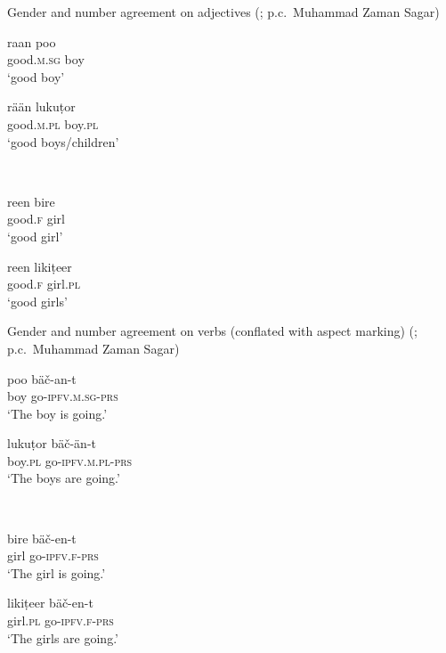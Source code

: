 \documentclass[output=collectionpaper]{langsci/langscibook}
\begin{document}
\begin{xlist}
\ex
Gender and number agreement on adjectives (\citealt[19]{Baart1999}; p.c.\ Muhammad Zaman Sagar)\\
\medskip
\begin{minipage}{0.25\textwidth}
\gll raan poo\\
good.\textsc{m.sg} boy\\
\glt`good boy'
\end{minipage}
%
\begin{minipage}{0.5\textwidth}
\gll rään lukuṭor\\
good.\textsc{m.pl} boy.\textsc{pl}\\
\glt `good boys/children'
\end{minipage}
\\
\vspace{3mm}
\begin{minipage}{0.25\textwidth}
\gll reen bire\\
good.\textsc{f} girl\\
\glt `good girl'
\end{minipage}
%
\begin{minipage}{0.25\textwidth}
\gll reen likiṭeer\\
 good.\textsc{f} girl.\textsc{pl}\\
\glt `good girls'
\end{minipage}
\medskip
\ex
Gender and number agreement on verbs (conflated with aspect marking) (\citealt[19]{Baart1999}; p.c.\ Muhammad Zaman Sagar)\\
\medskip
\begin{minipage}{0.4\textwidth}
\gll poo bäč{}-an{}-t\\
boy go-\textsc{ipfv.m.sg-prs}\\
\glt `The boy is going.'
\end{minipage}
%
\begin{minipage}{0.4\textwidth}
\gll lukuṭor bäč{}-än{}-t\\
  boy.\textsc{pl} go-\textsc{ipfv.m.pl-prs}\\
\glt   `The boys are going.'
\end{minipage}
\\
\vspace{3mm}
\begin{minipage}{0.4\textwidth}
\gll bire bäč{}-en{}-t\\
girl go-\textsc{ipfv.f-prs} \\
\glt `The girl is going.'
\end{minipage}
%
\begin{minipage}{0.4\textwidth}
\gll likiṭeer bäč-en{}-t\\
 girl.\textsc{pl} go-\textsc{ipfv.f-prs}\\
\glt `The girls are going.'
\end{minipage}
%

\end{xlist}
\z
\end{document}
